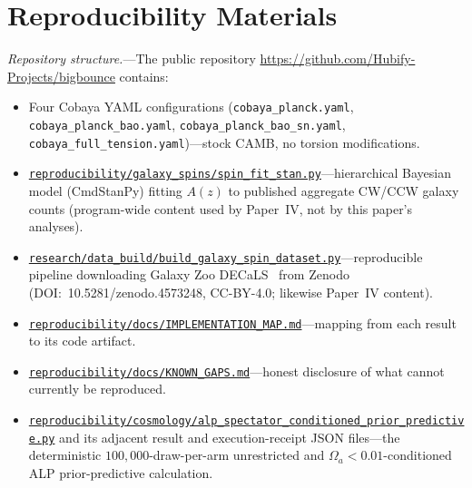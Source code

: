 \documentclass[aps,prd,twocolumn,superscriptaddress,showpacs,preprintnumbers,nofootinbib,longbibliography,floatfix]{revtex4-2}
\newcommand{\repoBase}{https://github.com/Hubify-Projects/bigbounce/blob/main}
\newcommand{\artifact}[1]{\href{\repoBase/#1}{\nolinkurl{#1}}}
\begin{document}

\section{Reproducibility Materials}\label{app:reproducibility}

\textit{Repository structure.}---The public repository
\url{https://github.com/Hubify-Projects/bigbounce}
contains:
\begin{itemize}[leftmargin=*]
\item Four Cobaya YAML configurations (\texttt{cobaya\_planck.yaml},
\texttt{cobaya\_planck\_bao.yaml}, \texttt{cobaya\_planck\_bao\_sn.yaml},
\texttt{cobaya\_full\_tension.yaml})---stock CAMB, no torsion modifications.
\item \artifact{reproducibility/galaxy\_spins/spin\_fit\_stan.py}---hierarchical Bayesian model
(CmdStanPy) fitting $A(z)$ to published aggregate CW/CCW galaxy counts
(program-wide content used by Paper~IV, not by this paper's analyses).
\item \artifact{research/data\_build/build\_galaxy\_spin\_dataset.py}---reproducible pipeline
downloading Galaxy Zoo DECaLS~\cite{Walmsley2022} from Zenodo
(DOI:~10.5281/zenodo.4573248, CC-BY-4.0; likewise Paper~IV content).
\item \artifact{reproducibility/docs/IMPLEMENTATION\_MAP.md}---mapping from each result to its
code artifact.
\item \artifact{reproducibility/docs/KNOWN\_GAPS.md}---honest disclosure of what cannot currently
be reproduced.
\item \artifact{reproducibility/cosmology/alp_spectator_conditioned_prior_predictive.py}
and its adjacent result and execution-receipt JSON files---the deterministic
$100{,}000$-draw-per-arm unrestricted and $\Omega_a<0.01$-conditioned ALP
prior-predictive calculation.
\end{itemize}
\end{document}
